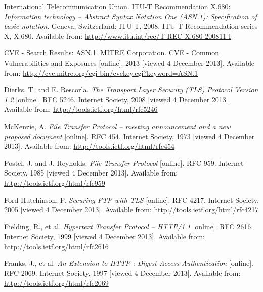 
\def\bibname{Bibliography}
\begin{thebibliography}{99}
\addcontentsline{toc}{chapter}{\bibname}


	{\sc International Telecommunication Union}.
	ITU-T Recommendation X.680:
	\emph{Information technology -- Abstract Syntax Notation One (ASN.1): Specification of basic notation}.
	Geneva, Switzerland: ITU-T, 2008.
	ITU-T Recommendation series X, X.680.
	Available from: \url{http://www.itu.int/rec/T-REC-X.680-200811-I}

	CVE - Search Results: ASN.1.
	{\sc MITRE Corporation}.
	CVE - Common Vulnerabilities and Exposures
	[online].
	2013 [viewed 4 December 2013].
	Available from: \url{http://cve.mitre.org/cgi-bin/cvekey.cgi?keyword=ASN.1}

	{\sc Dierks,} T. and E. {\sc Rescorla}.
	\emph{The Transport Layer Security (TLS) Protocol Version 1.2}
	[online].
	RFC 5246.
	Internet Society, 2008 [viewed 4 December 2013].
	Available from: \url{http://tools.ietf.org/html/rfc5246}


	{\sc McKenzie,} A.
	\emph{File Transfer Protocol -- meeting announcement and a new proposed document}
	[online].
	RFC 454.
	Internet Society, 1973 [viewed 4 December 2013].
	Available from: \url{http://tools.ietf.org/html/rfc454}

	{\sc Postel,} J. and J. {\sc Reynolds}.
	\emph{File Transfer Protocol}
	[online].
	RFC 959.
	Internet Society, 1985 [viewed 4 December 2013].
	Available from: \url{http://tools.ietf.org/html/rfc959}

	{\sc Ford-Hutchinson,} P.
	\emph{Securing FTP with TLS}
	[online].
	RFC 4217.
	Internet Society, 2005 [viewed 4 December 2013].
	Available from: \url{http://tools.ietf.org/html/rfc4217}

	{\sc Fielding,} R., et al.
	\emph{Hypertext Transfer Protocol -- HTTP/1.1}
	[online].
	RFC 2616.
	Internet Society, 1999 [viewed 4 December 2013].
	Available from: \url{http://tools.ietf.org/html/rfc2616}

	{\sc Franks,} J., et al.
	\emph{An Extension to HTTP : Digest Access Authentication}
	[online].
	RFC 2069.
	Internet Society, 1997 [viewed 4 December 2013].
	Available from: \url{http://tools.ietf.org/html/rfc2069}


\end{thebibliography}
